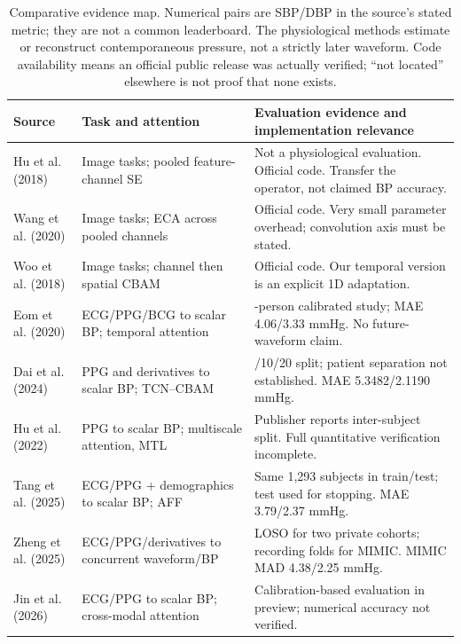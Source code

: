 \documentclass[11pt]{article}
\begin{document}
\begin{table}[t]
\centering\footnotesize
\begin{tabularx}{\textwidth}{@{}>{\raggedright\arraybackslash}p{2.25cm}>{\raggedright\arraybackslash}p{3.5cm}>{\raggedright\arraybackslash}X@{}}
\toprule
Source & Task and attention & Evaluation evidence and implementation relevance\\
\midrule
Hu et al. (2018) & Image tasks; pooled feature-channel SE & Not a physiological evaluation. Official code. Transfer the operator, not claimed BP accuracy.\\
Wang et al. (2020) & Image tasks; ECA across pooled channels & Official code. Very small parameter overhead; convolution axis must be stated.\\
Woo et al. (2018) & Image tasks; channel then spatial CBAM & Official code. Our temporal version is an explicit 1D adaptation.\\
Eom et al. (2020) & ECG/PPG/BCG to scalar BP; temporal attention & 15-person calibrated study; MAE 4.06/3.33 mmHg. No future-waveform claim.\\
Dai et al. (2024) & PPG and derivatives to scalar BP; TCN--CBAM & 70/10/20 split; patient separation not established. MAE 5.3482/2.1190 mmHg.\\
Hu et al. (2022) & PPG to scalar BP; multiscale attention, MTL & Publisher reports inter-subject split. Full quantitative verification incomplete.\\
Tang et al. (2025) & ECG/PPG + demographics to scalar BP; AFF & Same 1,293 subjects in train/test; test used for stopping. MAE 3.79/2.37 mmHg.\\
Zheng et al. (2025) & ECG/PPG/derivatives to concurrent waveform/BP & LOSO for two private cohorts; recording folds for MIMIC. MIMIC MAD 4.38/2.25 mmHg.\\
Jin et al. (2026) & ECG/PPG to scalar BP; cross-modal attention & Calibration-based evaluation in preview; numerical accuracy not verified.\\
\bottomrule
\end{tabularx}
\caption{Comparative evidence map. Numerical pairs are SBP/DBP in the source's stated metric; they are not a common leaderboard. The physiological methods estimate or reconstruct contemporaneous pressure, not a strictly later waveform. Code availability means an official public release was actually verified; ``not located'' elsewhere is not proof that none exists.}
\label{tab:literature}
\end{table}
\end{document}

